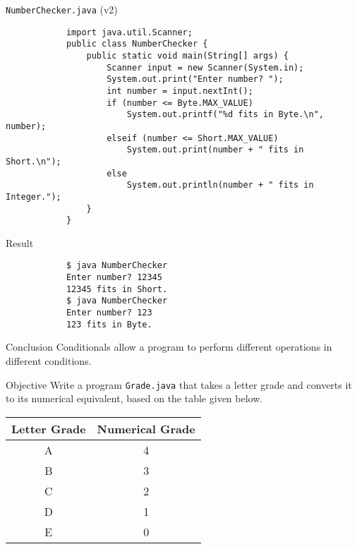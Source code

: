 \documentclass[10pt, compress]{beamer}
\begin{document}
\begin{slide}
	\begin{block}{\texttt{NumberChecker.java} (v2)}
		\begin{verbatim}
			import java.util.Scanner;
			public class NumberChecker {
			    public static void main(String[] args) {
			        Scanner input = new Scanner(System.in);
			        System.out.print("Enter number? ");
			        int number = input.nextInt();
			        if (number <= Byte.MAX_VALUE)
			            System.out.printf("%d fits in Byte.\n", number);
			        elseif (number <= Short.MAX_VALUE)
			            System.out.print(number + " fits in Short.\n");
			        else
			            System.out.println(number + " fits in Integer.");
			    }
			}
		\end{verbatim}
	\end{block}
\end{slide}

\begin{slide}
	\begin{block}{Result}
		\begin{verbatim}
			$ java NumberChecker
			Enter number? 12345
			12345 fits in Short.
			$ java NumberChecker
			Enter number? 123
			123 fits in Byte.
		\end{verbatim}
	\end{block}
	\begin{block}{Conclusion}
		Conditionals allow a program to perform different operations in different conditions.
	\end{block}
\end{slide}

\begin{slide}
	\begin{block}{Objective}
		Write a program \texttt{Grade.java} that takes a letter grade and converts it to its numerical equivalent, based on the table given below.
		\begin{table}[H]
			\begin{tabular}{c|c}
				Letter Grade & Numerical Grade\\
				\hline
				A & 4\\
				B & 3\\
				C & 2\\
				D & 1\\
				E & 0\\
			\end{tabular}
		\end{table}
	\end{block}
\end{slide}
\end{document}
